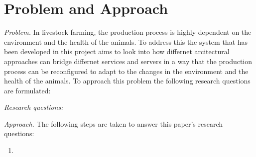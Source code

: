 \section{Problem and Approach}

\label{sec:problem}
\emph{Problem.}
In livestock farming, the production process is highly dependent on the environment and the health of the animals. To address this the system that has been developed in this project aims to look into how differnet arcitectural approaches can bridge differnet services and servers in a way that the production process can be reconfigured to adapt to the changes in the environment and the health of the animals. To approach this problem the following research questions are formulated:

\emph{Research questions:}
\begin{enumerate}
    
\end{enumerate}


\emph{Approach.}
The following steps are taken to answer this paper's research questions: 
\begin{enumerate}
    \item 
\end{enumerate}